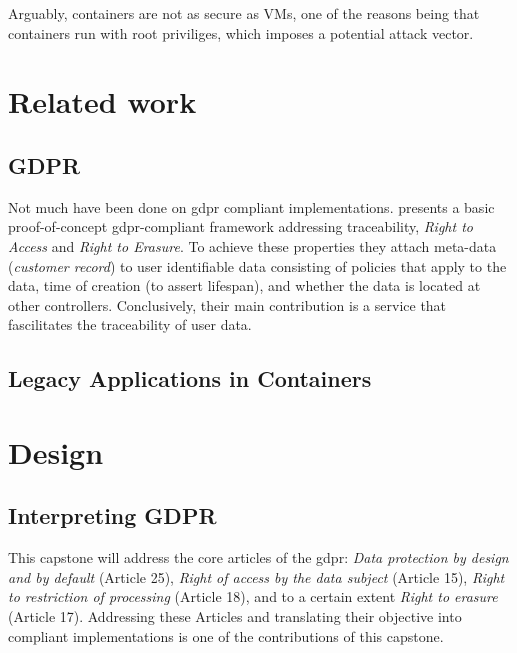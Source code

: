\documentclass[USenglish]{uit-thesis}
\begin{document}
Arguably, containers are not as secure as VMs, one of the reasons being
that containers run with root priviliges, which imposes a potential attack vector.


\chapter{Related work}
\section{GDPR}
Not much have been done on \gls{gdpr} compliant implementations.
\cite{danishguy} presents a basic proof-of-concept \gls{gdpr}-compliant framework addressing
traceability, \textit{Right to Access} and \textit{Right to Erasure}.
To achieve these properties they attach meta-data (\textit{customer record}) to user identifiable data consisting of
policies that apply to the data, time of creation (to assert lifespan), and
whether the data is located at other controllers.
Conclusively, their main contribution is a service that fascilitates
the traceability of user data.

\section{Legacy Applications in Containers}


\chapter{Design}
\section{Interpreting GDPR}
This capstone will address the core articles of the \gls{gdpr}:
\textit{Data protection by design and by default} (Article 25), \textit{Right of access by the data subject} (Article 15),
\textit{Right to restriction of processing} (Article 18), and to a certain extent \textit{Right to erasure} (Article 17).
Addressing these Articles and translating their objective into compliant implementations is one of the
contributions of this capstone.
\end{document}
